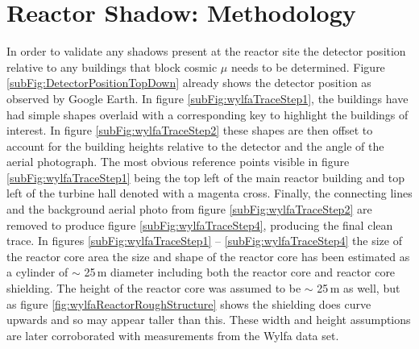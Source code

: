 
\section{Reactor Shadow: Methodology} \label{sec:ReactorShadowMethodology}
In order to validate any shadows present at the reactor site the detector position relative to any buildings that block cosmic $\mu$ needs to be determined. Figure \ref{subFig:DetectorPositionTopDown} already shows the detector position as observed by Google Earth. In figure \ref{subFig:wylfaTraceStep1}, the buildings have had simple shapes overlaid with a corresponding key to highlight the buildings of interest. In figure \ref{subFig:wylfaTraceStep2} these shapes are then offset to account for the building heights relative to the detector and the angle of the aerial photograph. The most obvious reference points visible in figure \ref{subFig:wylfaTraceStep1} being the top left of the main reactor building and top left of the turbine hall denoted with a magenta cross. Finally, the connecting lines and the background aerial photo from figure \ref{subFig:wylfaTraceStep2} are removed to produce figure \ref{subFig:wylfaTraceStep4}, producing the final clean trace. In figures \ref{subFig:wylfaTraceStep1}  -- \ref{subFig:wylfaTraceStep4} the size of the reactor core area the size and shape of the reactor core has been estimated as a cylinder of $\sim$ 25\,m diameter \cite{rMillsReactorSize} including both the reactor core and reactor core shielding. The height of the reactor core was assumed to be $\sim$ 25\,m as well, but as figure \ref{fig:wylfaReactorRoughStructure} shows the shielding does curve upwards and so may appear taller than this. These width and height assumptions are later corroborated with measurements from the Wylfa data set. 

